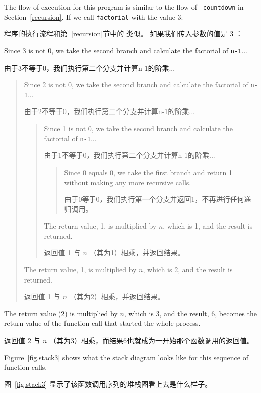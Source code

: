 %
The flow of execution for this program is similar to the flow of {\tt
countdown} in Section~\ref{recursion}.  If we call {\tt factorial}
with the value 3:

程序的执行流程和第~\ref{recursion}节中的  类似。
如果我们传入参数的值是 3 ：

Since 3 is not 0, we take the second branch and calculate the factorial
of {\tt n-1}...

由于3不等于0，我们执行第二个分支并计算n-1的阶乘...

\begin{quote}
Since 2 is not 0, we take the second branch and calculate the factorial of
{\tt n-1}...

由于2不等于0，我们执行第二个分支并计算n-1的阶乘...

  \begin{quote}
  Since 1 is not 0, we take the second branch and calculate the factorial
  of {\tt n-1}...

  由于1不等于0，我们执行第二个分支并计算n-1的阶乘...

    \begin{quote}
    Since 0 equals 0, we take the first branch and return 1
    without making any more recursive calls.

    由于0等于0，我们执行第一个分支并返回1，不再进行任何递归调用。

    \end{quote}


  The return value, 1, is multiplied by $n$, which is 1, and the
  result is returned.

  返回值 1 与 $n$ （其为1）相乘，并返回结果。
  \end{quote}


The return value, 1, is multiplied by $n$, which is 2, and the
result is returned.

返回值 1 与 $n$ （其为2）相乘，并返回结果。
\end{quote}


The return value (2) is multiplied by $n$, which is 3, and the result, 6,
becomes the return value of the function call that started the whole
process.

返回值 2 与 $n$ （其为3）相乘，而结果6也就成为一开始那个函数调用的返回值。

Figure~\ref{fig.stack3} shows what the stack diagram looks like for
this sequence of function calls.

图~\ref{fig.stack3} 显示了该函数调用序列的堆栈图看上去是什么样子。

